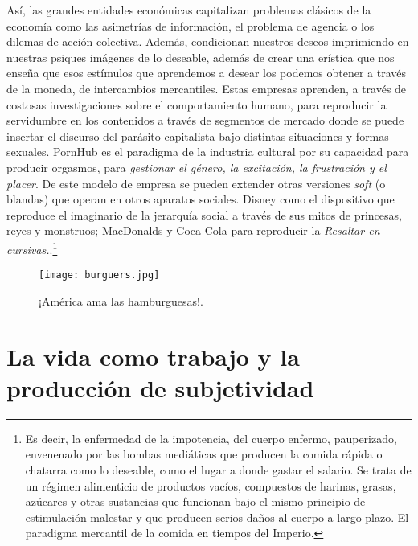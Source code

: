 Así, las grandes entidades económicas capitalizan problemas clásicos de la economía como las asimetrías de información, el problema de agencia o los dilemas de acción colectiva. Además, condicionan nuestros deseos imprimiendo en nuestras psiques imágenes de lo deseable, además de crear una erística que nos enseña que esos estímulos que aprendemos a desear los podemos obtener a través de la moneda, de intercambios mercantiles. Estas empresas aprenden, a través de costosas investigaciones sobre el comportamiento humano, para reproducir la servidumbre en los contenidos a través de segmentos de mercado donde se puede insertar el discurso del parásito capitalista bajo distintas situaciones y formas sexuales. PornHub es el paradigma de la industria cultural por su capacidad para producir orgasmos, para \emph{gestionar el género, la excitación, la frustración y el placer}. De este modelo de empresa se pueden extender otras versiones \emph{soft} (o blandas) que operan en otros aparatos sociales. Disney como el dispositivo que reproduce el imaginario de la jerarquía social a través de sus mitos de princesas, reyes y monstruos; MacDonalds y Coca Cola para reproducir la \emph{Resaltar en cursivas.}.\footnote{Es decir, la enfermedad de la impotencia, del cuerpo enfermo, pauperizado, envenenado por las bombas mediáticas que producen la comida rápida o chatarra como lo deseable, como el lugar a donde gastar el salario. Se trata de un régimen alimenticio de productos vacíos, compuestos de harinas, grasas, azúcares y otras sustancias que funcionan bajo el mismo principio de estimulación-malestar y que producen serios daños al cuerpo a largo plazo. El paradigma mercantil de la comida en tiempos del Imperio.}

\begin{figure}[htbp]
	\centering
	\texttt{[image: burguers.jpg]}
	\caption{¡América ama las hamburguesas!.}
	\label{fig:burger}
\end{figure}

\section{La vida como trabajo y la producción de subjetividad}
\label{sec:subjetividad}

